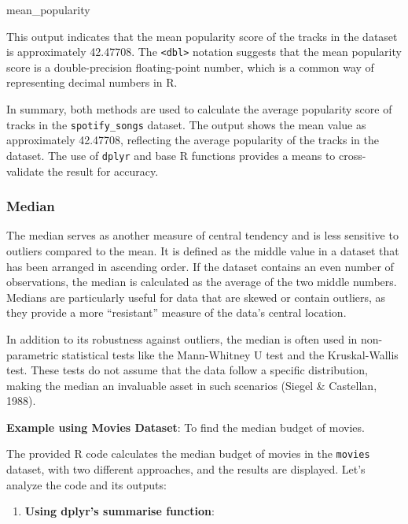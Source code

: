 \documentclass[
]{book}
\newenvironment{Shaded}{\begin{snugshade}}{\end{snugshade}}
\newcommand{\NormalTok}[1]{#1}
\providecommand{\tightlist}{%
  \setlength{\itemsep}{0pt}\setlength{\parskip}{0pt}}
\begin{document}
\begin{Shaded}
\begin{Highlighting}[]
\NormalTok{mean\_popularity}
\end{Highlighting}
\end{Shaded}

This output indicates that the mean popularity score of the tracks in the dataset is approximately 42.47708. The \texttt{\textless{}dbl\textgreater{}} notation suggests that the mean popularity score is a double-precision floating-point number, which is a common way of representing decimal numbers in R.

In summary, both methods are used to calculate the average popularity score of tracks in the \texttt{spotify\_songs} dataset. The output shows the mean value as approximately 42.47708, reflecting the average popularity of the tracks in the dataset. The use of \texttt{dplyr} and base R functions provides a means to cross-validate the result for accuracy.

\hypertarget{median}{%
\subsubsection*{Median}\label{median}}

The median serves as another measure of central tendency and is less sensitive to outliers compared to the mean. It is defined as the middle value in a dataset that has been arranged in ascending order. If the dataset contains an even number of observations, the median is calculated as the average of the two middle numbers. Medians are particularly useful for data that are skewed or contain outliers, as they provide a more ``resistant'' measure of the data's central location.

In addition to its robustness against outliers, the median is often used in non-parametric statistical tests like the Mann-Whitney U test and the Kruskal-Wallis test. These tests do not assume that the data follow a specific distribution, making the median an invaluable asset in such scenarios (Siegel \& Castellan, 1988).

\textbf{Example using Movies Dataset}: To find the median budget of movies.

The provided R code calculates the median budget of movies in the \texttt{movies} dataset, with two different approaches, and the results are displayed. Let's analyze the code and its outputs:

\begin{enumerate}
\def\labelenumi{\arabic{enumi}.}
\tightlist
\item
  \textbf{Using dplyr's summarise function}:
\end{enumerate}
\end{document}
